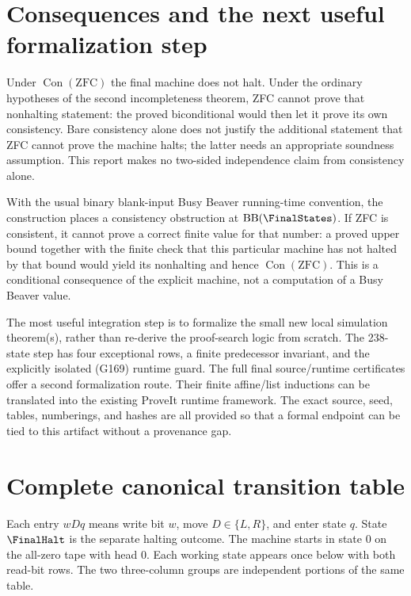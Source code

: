 \documentclass[11pt,letterpaper]{article}
\theoremstyle{definition}\newtheorem{definition}[theorem]{Definition}
\newcommand{\Con}{\operatorname{Con}}
\newcommand{\ZFC}{\mathrm{ZFC}}
\begin{document}
\section{Consequences and the next useful formalization step}

Under $\Con(\ZFC)$ the final machine does not halt.  Under the ordinary
hypotheses of the second incompleteness theorem, ZFC cannot prove that
nonhalting statement: the proved biconditional would then let it prove
its own consistency.  Bare consistency alone does not justify the
additional statement that ZFC cannot prove the machine halts; the latter
needs an appropriate soundness assumption.  This report makes no
two-sided independence claim from consistency alone.

With the usual binary blank-input Busy Beaver running-time convention,
the construction places a consistency obstruction at
$\mathrm{BB}(\FinalStates)$.  If ZFC is consistent, it cannot prove a
correct finite value for that number: a proved upper bound together with
the finite check that this particular machine has not halted by that
bound would yield its nonhalting and hence $\Con(\ZFC)$.  This is a
conditional consequence of the explicit machine, not a computation of a
Busy Beaver value.

The most useful integration step is to formalize the small new local
simulation theorem(s), rather than re-derive the proof-search logic from
scratch.  The 238-state step has four exceptional rows, a finite
predecessor invariant, and the explicitly isolated (G169) runtime guard.
The full final source/runtime certificates offer a second formalization
route.  Their finite affine/list inductions can be translated into the
existing ProveIt runtime framework.  The exact source, seed, tables,
numberings, and hashes are all provided so that a formal endpoint can be
tied to this artifact without a provenance gap.

\appendix
\section{Complete canonical transition table}\label{app:table}

Each entry $wDq$ means write bit $w$, move $D\in\{L,R\}$, and enter
state $q$.  State $\FinalHalt$ is the separate halting outcome.  The
machine starts in state $0$ on the all-zero tape with head $0$.  Each
working state appears once below with both read-bit rows.  The two
three-column groups are independent portions of the same table.
\end{document}
